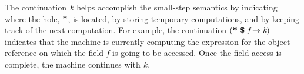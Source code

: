 The continuation $\emph{k}$ helps accomplish the small-step semantics
by indicating where the hole, $\textbf{*}$, is located, by storing
temporary computations, and by keeping track of the next
computation. For example, the continuation
$\lp\cfgt{*}\ \cfgt{\$}\ \cfgnt{f} \rightarrow \cfgnt{k}\rp$ indicates
that the machine is currently computing the expression for the object
reference on which the field $\emph{f}$ is going to be accessed. Once
the field access is complete, the machine continues with $\emph{k}$.







